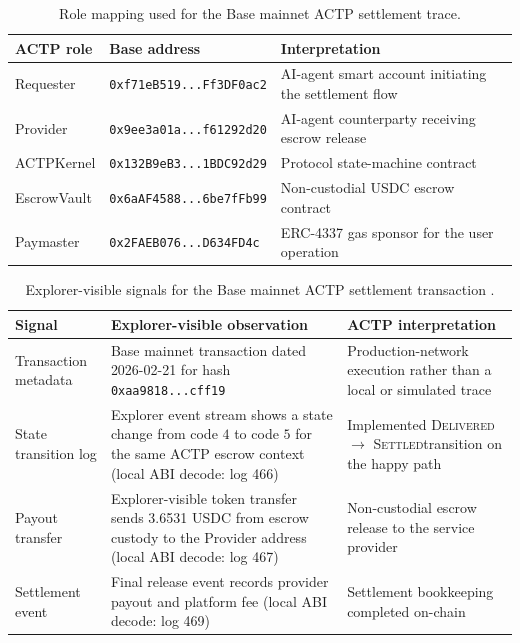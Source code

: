 \documentclass[11pt]{article}
\theoremstyle{plain}
\theoremstyle{definition}
\newcommand{\sDELIV}{\textsc{Delivered}}
\newcommand{\sSETTL}{\textsc{Settled}}
\begin{document}
\begin{table}[h]
\centering
\caption{Role mapping used for the Base mainnet ACTP settlement trace.}
\label{tab:mainnet_roles}
\small
\begin{tabular}{@{}lll@{}}
\toprule
\textbf{ACTP role} & \textbf{Base address} & \textbf{Interpretation} \\
\midrule
Requester & \texttt{0xf71eB519...Ff3DF0ac2} & AI-agent smart account initiating the settlement flow \\
Provider & \texttt{0x9ee3a01a...f61292d20} & AI-agent counterparty receiving escrow release \\
ACTPKernel & \texttt{0x132B9eB3...1BDC92d29} & Protocol state-machine contract \\
EscrowVault & \texttt{0x6aAF4588...6be7fFb99} & Non-custodial USDC escrow contract \\
Paymaster & \texttt{0x2FAEB076...D634FD4c} & ERC-4337 gas sponsor for the user operation \\
\bottomrule
\end{tabular}
\end{table}

\begin{table}[h]
\centering
\caption{Explorer-visible signals for the Base mainnet ACTP settlement transaction \cite{ACTPmainnettx}.}
\label{tab:mainnet_trace}
\small
\begin{tabular}{@{}p{}p{}p{}@{}}
\toprule
\textbf{Signal} & \textbf{Explorer-visible observation} & \textbf{ACTP interpretation} \\
\midrule
Transaction metadata & Base mainnet transaction dated 2026-02-21 for hash \texttt{0xaa9818...cff19} & Production-network execution rather than a local or simulated trace \\
State transition log & Explorer event stream shows a state change from code $4$ to code $5$ for the same ACTP escrow context (local ABI decode: log 466) & Implemented \sDELIV $\rightarrow$ \sSETTL transition on the happy path \\
Payout transfer & Explorer-visible token transfer sends 3.6531 USDC from escrow custody to the Provider address (local ABI decode: log 467) & Non-custodial escrow release to the service provider \\
Settlement event & Final release event records provider payout and platform fee (local ABI decode: log 469) & Settlement bookkeeping completed on-chain \\
\bottomrule
\end{tabular}
\end{table}
\end{document}
